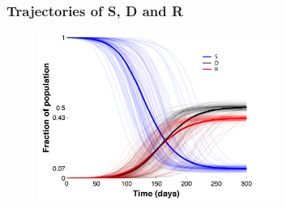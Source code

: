 \documentclass[30pt]{beamer}
\begin{document}
\begin{frame}
\frametitle{Trajectories of S, D and R}
\begin{figure}
\includegraphics[width = 0.7\textwidth]{SDRcurves.pdf}
\end{figure}
\end{frame}
\end{document}
